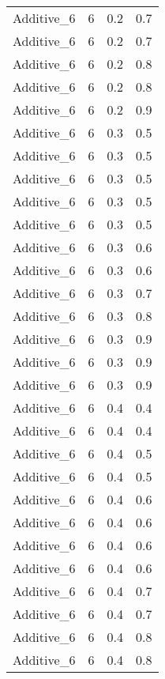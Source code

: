 \documentclass{article}
\begin{document}
\begin{longtable}[H]{lrrr}
 Additive\_6 &       6 &   0.2 &            0.7 \\
 Additive\_6 &       6 &   0.2 &            0.7 \\
 Additive\_6 &       6 &   0.2 &            0.8 \\
 Additive\_6 &       6 &   0.2 &            0.8 \\
 Additive\_6 &       6 &   0.2 &            0.9 \\
 Additive\_6 &       6 &   0.3 &            0.5 \\
 Additive\_6 &       6 &   0.3 &            0.5 \\
 Additive\_6 &       6 &   0.3 &            0.5 \\
 Additive\_6 &       6 &   0.3 &            0.5 \\
 Additive\_6 &       6 &   0.3 &            0.5 \\
 Additive\_6 &       6 &   0.3 &            0.6 \\
 Additive\_6 &       6 &   0.3 &            0.6 \\
 Additive\_6 &       6 &   0.3 &            0.7 \\
 Additive\_6 &       6 &   0.3 &            0.8 \\
 Additive\_6 &       6 &   0.3 &            0.9 \\
 Additive\_6 &       6 &   0.3 &            0.9 \\
 Additive\_6 &       6 &   0.3 &            0.9 \\
 Additive\_6 &       6 &   0.4 &            0.4 \\
 Additive\_6 &       6 &   0.4 &            0.4 \\
 Additive\_6 &       6 &   0.4 &            0.5 \\
 Additive\_6 &       6 &   0.4 &            0.5 \\
 Additive\_6 &       6 &   0.4 &            0.6 \\
 Additive\_6 &       6 &   0.4 &            0.6 \\
 Additive\_6 &       6 &   0.4 &            0.6 \\
 Additive\_6 &       6 &   0.4 &            0.6 \\
 Additive\_6 &       6 &   0.4 &            0.7 \\
 Additive\_6 &       6 &   0.4 &            0.7 \\
 Additive\_6 &       6 &   0.4 &            0.8 \\
 Additive\_6 &       6 &   0.4 &            0.8 \\

\end{longtable}
\end{document}
